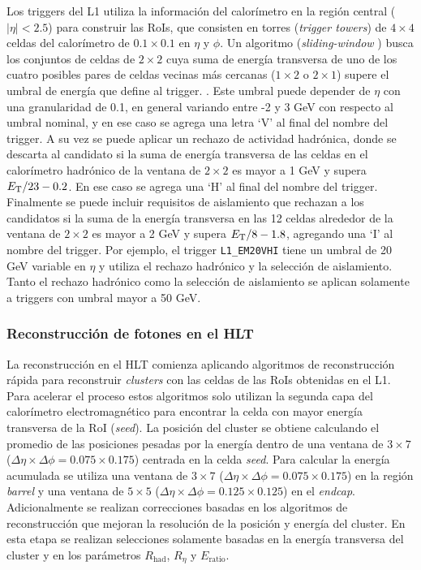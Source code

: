 Los triggers del L1 
utiliza la información del calorímetro en la región central ($|\eta|<2.5$) para construir las RoIs, que consisten en torres (\textit{trigger towers}) de $4\times4$ celdas del calorímetro de $0.1\times0.1$ en $\eta$ y $\phi$. Un algoritmo (\textit{sliding-window} \cite{Lampl:1099735}) busca los conjuntos de celdas de $2\times2$ cuya suma de energía transversa de uno de los cuatro posibles pares de celdas vecinas más cercanas ($1\times2$ o $2\times1$) supere el umbral de energía que define al trigger. 
 . 
Este umbral puede depender de $\eta$ con una granularidad de 0.1, en general variando entre -2 y 3 GeV con respecto al umbral nominal, y en ese caso se agrega una letra `V' al final del nombre del trigger. A su vez se puede aplicar un rechazo de actividad hadrónica, donde se descarta al candidato si la suma de energía transversa de las celdas en el calorímetro hadrónico de la ventana de $2\times2$ es mayor a 1 GeV y supera $E_{\text{T}}/23-0.2$. En ese caso se agrega una `H' al final del nombre del trigger. Finalmente se puede incluir requisitos de aislamiento que rechazan a los candidatos si la suma de la energía transversa en las 12 celdas alrededor de la ventana de $2\times2$ es mayor a 2 GeV y supera $E_{\text{T}}/8-1.8$, agregando una `I' al nombre del trigger. Por ejemplo, el trigger \texttt{L1\_EM20VHI} tiene un umbral de 20 GeV variable en $\eta$ y utiliza el rechazo hadrónico y la selección de aislamiento. Tanto el rechazo hadrónico como la selección de aislamiento se aplican solamente a triggers con umbral mayor a 50 GeV.

\subsubsection{Reconstrucción de fotones en el HLT}

La reconstrucción en el HLT comienza aplicando algoritmos de reconstrucción rápida para reconstruir \textit{clusters} con las celdas de las RoIs obtenidas en el L1. Para acelerar el proceso estos algoritmos solo utilizan la segunda capa del calorímetro electromagnético para encontrar la celda con mayor energía transversa de la RoI (\textit{seed}). La posición del cluster se obtiene calculando el
promedio de las posiciones pesadas por la energía
dentro de una ventana de $3\times7$ ($\Delta\eta\times\Delta\phi = 0.075\times0.175$) centrada en la celda \textit{seed}. Para calcular la energía acumulada 
se utiliza una ventana de $3\times7$ ($\Delta\eta\times\Delta\phi = 0.075\times0.175$) en la región \textit{barrel} y una ventana de $5\times5$ ($\Delta\eta\times\Delta\phi = 0.125\times0.125$) en el \textit{endcap}. Adicionalmente se realizan correcciones basadas en los algoritmos de reconstrucción que mejoran la resolución de la posición y energía del cluster. En esta etapa se realizan selecciones solamente basadas en la energía transversa del cluster y en los parámetros $R_{\text{had}}$, $R_{\eta}$ y $E_{\text{ratio}}$.


